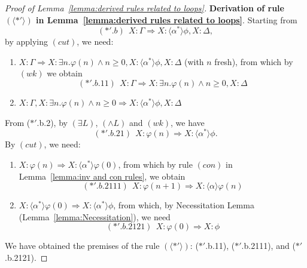\documentclass[manuscript,screen]{acmart}
\newcommand{\la}[0]{\langle}
\newcommand{\ra}[0]{\rangle}
\newcommand{\lup}[0]{*}
\begin{document}
\begin{proof}[Proof of Lemma~\ref{lemma:derived rules related to loops}]
    \textbf{Derivation of rule $(\la\lup'\ra)$ in Lemma~\ref{lemma:derived rules related to loops}}. 
    Starting from 
    $$
    (*'.b)\ \ X : \Gamma\Rightarrow X : \la\alpha^\lup\ra\phi, X : \Delta,
    $$
by applying $(cut)$, we need: 
    \begin{enumerate}
    \item[($*'$.b.1)] $X : \Gamma\Rightarrow X : \exists n. \varphi(n)\wedge n\ge 0, X : \la\alpha^*\ra\phi, X : \Delta$ (with $n$ fresh), from which by $(wk)$ we obtain
    $$
    (*'.b.11)\ \ X : \Gamma\Rightarrow X : \exists n. \varphi(n)\wedge n\ge 0, X : \Delta
    $$
    \item[($*'$.b.2)] $X : \Gamma,  X : \exists n. \varphi(n)\wedge n\ge 0\Rightarrow X : \la\alpha^*\ra\phi, X : \Delta$
    \end{enumerate}
    From ($*'$.b.2), by $(\exists L)$, $(\wedge L)$ and $(wk)$, we have
    $$
    (*'.b.21)\ \ X : \varphi(n)\Rightarrow X : \la\alpha^*\ra\phi. 
    $$
    By $(cut)$, we need:
    \begin{enumerate}
    \item[($*'$.b.211)] $X : \varphi(n)\Rightarrow X : \la\alpha^*\ra\varphi(0)$, from which by rule $(\textit{con})$ in Lemma~\ref{lemma:inv and con rules}, we obtain
    $$
    (*'.b.2111)\ \ X : \varphi(n+1)\Rightarrow X : \la\alpha\ra\varphi(n)
    $$
    \item[($*'$.b.212)] $X : \la\alpha^*\ra\varphi(0)\Rightarrow X : \la\alpha^*\ra\phi$, from which, by Necessitation Lemma (Lemma~\ref{lemma:Necessitation}), we need
    $$
    (*'.b.2121)\ \ X : \varphi(0)\Rightarrow X : \phi
    $$
    \end{enumerate}
We have obtained the premises of the rule $(\la *'\ra)$: ($*'$.b.11), ($*'$.b.2111), and ($*'$.b.2121). 
\end{proof}
\end{document}
